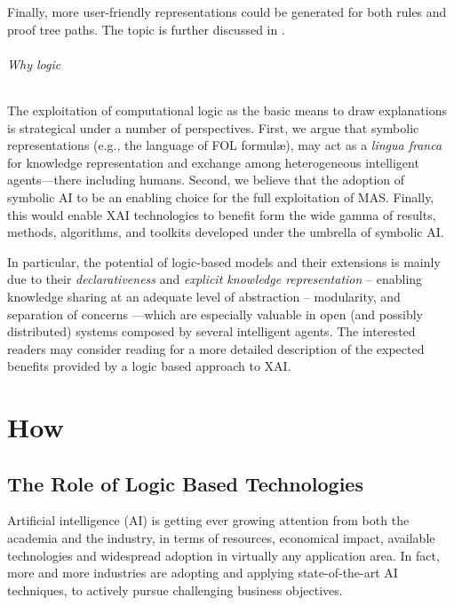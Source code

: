 \documentclass[12pt,a4paper,openright,twoside]{book}
\begin{document}
Finally, more user-friendly representations could be generated for both rules and proof tree paths.
%
The topic is further discussed in \cite{xailp-woa2019}.

\paragraph{Why logic}

The exploitation of computational logic as the basic means to draw explanations is strategical under a number of perspectives.
%
First, we argue that symbolic representations (e.g., the language of FOL formul\ae{}), may act as a \emph{lingua franca} for knowledge representation and exchange among heterogeneous intelligent agents---there including humans.
%
Second, we believe that the adoption of symbolic AI to be an enabling choice for the full exploitation of MAS.
%
Finally, this would enable XAI technologies to benefit form the wide gamma of results, methods, algorithms, and toolkits developed under the umbrella of symbolic AI.

In particular, the potential of logic-based models and their extensions is mainly due to their \emph{declarativeness} and \emph{explicit knowledge representation} -- enabling knowledge sharing at an adequate level of abstraction -- modularity, and separation of concerns \cite{OliyaP2011}---which are especially valuable in open (and possibly distributed) systems composed by several intelligent agents.
%
The interested readers may consider reading \cite{xmas-aiiot2019, expectation-extraamas2021} for a more detailed description of the expected benefits provided by a logic based approach to XAI.

\part{How}
\label{part:how}

\chapter{The Role of Logic Based Technologies}


Artificial intelligence (AI) is getting ever growing attention from both the academia and the industry, in terms of resources, economical impact, available technologies and widespread adoption in virtually any application area.
%
In fact, more and more industries are adopting and applying state-of-the-art AI techniques, to actively pursue challenging business objectives.
\end{document}
